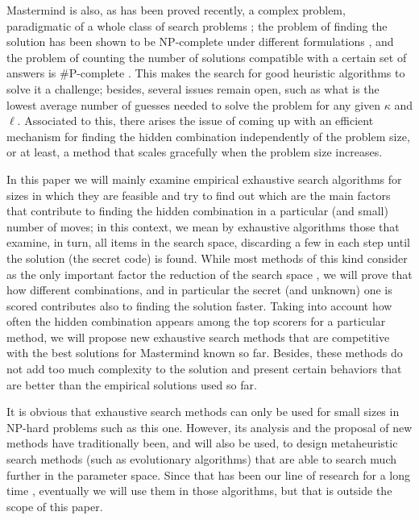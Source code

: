 \documentclass[preprint,12pt]{elsarticle}
\begin{document}
Mastermind is 
also, as has been proved recently, a complex problem, paradigmatic of a whole class of search
problems \cite{o1991mastermind};  the problem of finding the solution has been shown to be
NP-complete under different formulations
\cite{abs-cs-0512049,Kendall200813}, and the problem of counting the
number of solutions compatible with a certain set of answers is
\#P-complete \cite{DBLP:journals/corr/abs-1111-6922}. 
This makes the
search for good heuristic algorithms to solve it a challenge; besides, several issues remain open,
such as what is the lowest average number of guesses needed to solve the
problem for any given $\kappa$ and $\ell$. Associated to this, there arises
the issue of coming up with an efficient mechanism for finding the
hidden combination independently of the problem size, or at least, a method that
scales gracefully when the problem size increases.

In this paper we will mainly examine empirical exhaustive search algorithms for
sizes in which they are feasible and try to find out which are the
main factors that contribute to finding the hidden combination in a
particular (and small) number of moves; in this context, we mean by
exhaustive algorithms those that examine, in turn, all items in the
search space, discarding a few in each step until the solution (the
secret code) is found. While most methods of
this kind consider as
the only important factor the reduction of the search space \cite{Kooi200513}, we will
prove that how different combinations, and in particular the secret
(and unknown) one is scored contributes also to finding the solution
faster.
Taking into account how often the hidden combination appears
among the top scorers for a particular method, we will propose new
exhaustive search methods that are competitive with the best
solutions for Mastermind known so far. Besides, these methods do not
add too much complexity to the solution and present certain behaviors
that are better than the empirical solutions used so far. 

It is obvious that exhaustive search methods can only be used for
small sizes in NP-hard problems such as this one. However, its
analysis and the proposal of new methods have traditionally been,
and will also be used, to design metaheuristic search methods (such as
evolutionary algorithms) that are able to search much further in the
parameter space. Since that has been our line of research for a long
time \cite{jj-ppsn96,genmm99,mastermind05}, eventually we will use them in those
algorithms, but that is outside the scope of this paper.
\end{document}
